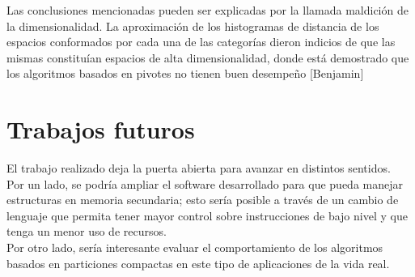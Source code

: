 Las conclusiones mencionadas pueden ser explicadas por la llamada maldici\'on de la dimensionalidad. La aproximaci\'on de los histogramas de distancia de los espacios conformados por cada una de las categor\'ias dieron indicios de que las mismas constitu\'ian espacios de alta dimensionalidad, donde est\'a demostrado que los algoritmos basados en pivotes no tienen buen desempeño [Benjamin]\\

\section{Trabajos futuros}

El trabajo realizado deja la puerta abierta para avanzar en distintos sentidos.\\

Por un lado, se podr\'ia ampliar el software desarrollado para que pueda manejar estructuras en memoria secundaria; esto ser\'ia posible a trav\'es de un cambio de lenguaje que permita tener mayor control sobre instrucciones de bajo nivel y que tenga un menor uso de recursos.\\

Por otro lado, ser\'ia interesante evaluar el comportamiento de los algoritmos basados en particiones compactas en este tipo de aplicaciones de la vida real.